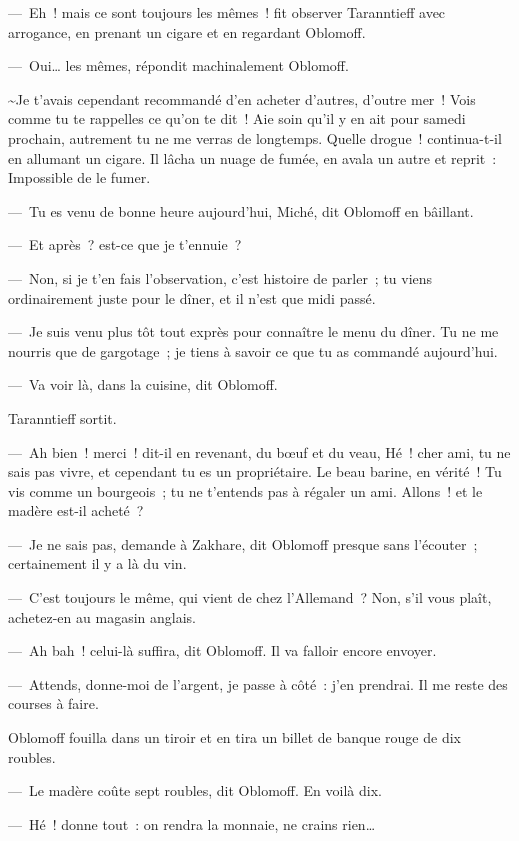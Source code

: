 \documentclass[french,twoside]{book} %
\begin{document}
— Eh ! mais ce sont toujours les mêmes ! fit observer Taranntieff avec arrogance, en prenant un cigare et en regardant Oblomoff.\par
— Oui… les mêmes, répondit machinalement Oblomoff.\par
\textasciitilde Je t’avais cependant recommandé d’en acheter d’autres, d’outre mer ! Vois comme tu te rappelles ce qu’on te dit ! Aie soin qu’il y en ait pour samedi prochain, autrement tu ne me verras de longtemps. Quelle drogue ! continua-t-il en allumant un cigare. Il lâcha un nuage de fumée, en avala un autre et reprit : Impossible de le fumer.\par
— Tu es venu de bonne heure aujourd’hui, Miché, dit Oblomoff en bâillant.\par
— Et après ? est-ce que je t’ennuie ?\par
— Non, si je t’en fais l’observation, c’est histoire de parler ; tu viens ordinairement juste pour le dîner, et il n’est que midi passé.\par
— Je suis venu plus tôt tout exprès pour connaître le menu du dîner. Tu ne me nourris que de gargotage ; je tiens à savoir ce que tu as commandé aujourd’hui.\par
— Va voir là, dans la cuisine, dit Oblomoff.\par
Taranntieff sortit.\par
— Ah bien ! merci ! dit-il en revenant, du bœuf et du veau, Hé ! cher ami, tu ne sais pas vivre, et cependant tu es un propriétaire. Le beau barine, en vérité ! Tu vis comme un bourgeois ; tu ne t’entends pas à régaler un ami. Allons ! et le madère est-il acheté ?\par
— Je ne sais pas, demande à Zakhare, dit Oblomoff presque sans l’écouter ; certainement il y a là du vin.\par
— C’est toujours le même, qui vient de chez l’Allemand ? Non, s’il vous plaît, achetez-en au magasin anglais.\par
— Ah bah ! celui-là suffira, dit Oblomoff. Il va falloir encore envoyer.\par
— Attends, donne-moi de l’argent, je passe à côté : j’en prendrai. Il me reste des courses à faire.\par
Oblomoff fouilla dans un tiroir et en tira un billet de banque rouge de dix roubles.\par
— Le madère coûte sept roubles, dit Oblomoff. En voilà dix.\par
— Hé ! donne tout : on rendra la monnaie, ne crains rien…\par
\end{document}
